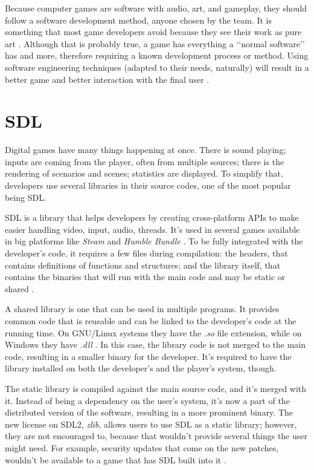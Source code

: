 Because computer games are software with audio, art, and gameplay, they should follow a software development method, anyone chosen by the team. It is something that most game developers avoid because they see their work as pure art \cite{bethke2003game}. Although that is probably true, a game has everything a \lq\lq normal software\rq\rq{} has and more, therefore requiring a known development process or method. Using software engineering techniques (adapted to their needs, naturally) will result in a better game and better interaction with the final user \cite{pressman2009software}.


\section{SDL}
\label {sec:sdl}

Digital games have many things happening at once. There is sound playing; inputs are coming from the player, often from multiple sources; there is the rendering of scenarios and scenes; statistics are displayed. To simplify that, developers use several libraries in their source codes, one of the most popular being SDL.

SDL is a library that helps developers by creating cross-platform APIs to make easier handling video, input, audio, threads. It's used in several games available in big platforms like \textit{Steam} and \textit{Humble Bundle} \cite{sdl2017}. To be fully integrated with the developer's code, it requires a few files during compilation: the headers, that contains definitions of functions and structures; and the library itself, that contains the binaries that will run with the main code and may be static or shared \cite{mitchell2013sdl}.

A shared library is one that can be used in multiple programs. It provides common code that is reusable and can be linked to the developer's code at the running time. On GNU/Linux systems they have the \textit{.so} file extension, while on Windows they have \textit{.dll} \cite{campbell2009algorithms}. In this case, the library code is not merged to the main code, resulting in a smaller binary for the developer. It's required to have the library installed on both the developer's and the player's system, though.

The static library is compiled against the main source code, and it's merged with it. Instead of being a dependency on the user's system, it's now a part of the distributed version of the software, resulting in a more prominent binary. The new license on SDL2, \textit{zlib}\footnotemark, allows users to use SDL as a static library; however, they are not encouraged to, because that wouldn't provide several things the user might need. For example, security updates that come on the new patches, wouldn't be available to a game that has SDL built into it \cite{ryangordon2017}.

